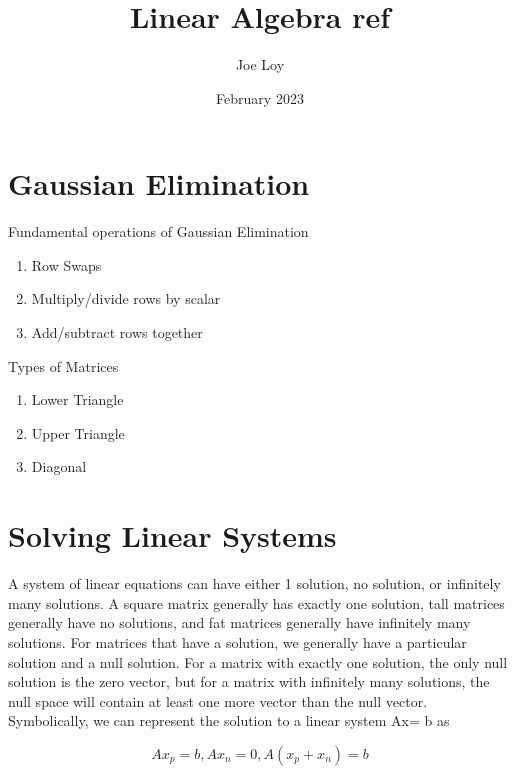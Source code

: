 \documentclass{article}
\title{Linear Algebra ref}
\author{Joe Loy}
\date{February 2023}
\begin{document}
\maketitle

\section{Gaussian Elimination}

Fundamental operations of Gaussian Elimination
\begin{enumerate}
    \item Row Swaps

    \item Multiply/divide rows by scalar

    \item Add/subtract rows together
\end{enumerate}

Types of Matrices 
\begin{enumerate}
    \item Lower Triangle \\

    \item Upper Triangle \\

    \item Diagonal \\
\end{enumerate}


\section{Solving Linear Systems}
A system of linear equations can have either 1 solution, no solution, or infinitely many solutions. A square matrix generally has exactly one solution, tall matrices generally have no solutions, and fat matrices generally have infinitely many solutions. For matrices that have a solution, we generally have a particular solution and a null solution. For a matrix with exactly one solution, the only null solution is the zero vector, but for a matrix with infinitely many solutions, the null space will contain at least one more vector than the null vector. \\ 

Symbolically, we can represent the solution to a linear system Ax= b as 

$$Ax_p = b, Ax_n = 0, A(x_p + x_n) = b $$
\end{document}
